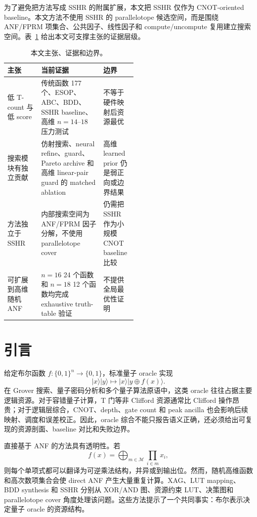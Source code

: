 \documentclass[UTF8,fontset=macnew,11pt]{ctexart}
\begin{document}
为了避免把方法写成 SSHR 的附属扩展，本文把 SSHR 仅作为 CNOT-oriented baseline。本文方法不使用 SSHR 的 parallelotope 候选空间，而是围绕 ANF/FPRM 项集合、公共因子、线性因子和 compute/uncompute 复用建立搜索空间。表~\ref{tab:claim_evidence} 给出本文可支撑主张的证据层级。

\begin{table}[t]
\centering
\small
\caption{本文主张、证据和边界。}
\label{tab:claim_evidence}
\begin{tabularx}{\linewidth}{>{\raggedright\arraybackslash}p{0.26\linewidth}
  >{\raggedright\arraybackslash}X
  >{\raggedright\arraybackslash}p{0.26\linewidth}}
\toprule
主张 & 当前证据 & 边界 \\
\midrule
低 T-count 与低 score & 传统函数 177 个、ESOP、ABC、BDD、SSHR baseline、高维 $n=14$--$18$ 压力测试 & 不等于硬件映射后资源最优 \\
搜索模块有独立贡献 & 仿射搜索、neural refine、guard、Pareto archive 和高维 linear-pair guard 的 matched ablation & 高维 learned prior 仍是弱正向或边界结果 \\
方法独立于 SSHR & 内部搜索空间为 ANF/FPRM 因子分解，不使用 parallelotope cover & 仍需把 SSHR 作为小规模 CNOT baseline 比较 \\
可扩展到高维随机 ANF & $n=16$ 24 个函数和 $n=18$ 12 个函数均完成 exhaustive truth-table 验证 & 不提供全局最优性证明 \\
\bottomrule
\end{tabularx}
\end{table}

\section{引言}

给定布尔函数 $f:\{0,1\}^{n}\rightarrow\{0,1\}$，标准量子 oracle 实现
\begin{equation}
  |x\rangle|y\rangle \mapsto |x\rangle|y\oplus f(x)\rangle .
\end{equation}
在 Grover 搜索、量子密码分析和多个量子算法原语中，这类 oracle 往往占据主要逻辑资源。对于容错量子计算，T 门等非 Clifford 资源通常比 Clifford 操作昂贵；对于逻辑层综合，CNOT、depth、gate count 和 peak ancilla 也会影响后续映射、调度和误差校正。因此，oracle 综合不能只报告语义正确，还必须给出可复现的资源剖面、baseline 对比和失败边界。

直接基于 ANF 的方法具有透明性。若
\begin{equation}
  f(x)=\bigoplus_{m\in\mathcal{M}}\prod_{i\in m}x_i ,
\end{equation}
则每个单项式都可以翻译为可逆乘法结构，并异或到输出位。然而，随机高维函数和高次数项集合会使 direct ANF 产生大量重复计算。XAG、LUT mapping、BDD synthesis 和 SSHR 分别从 XOR/AND 图、资源约束 LUT、决策图和 parallelotope cover 角度处理该问题\cite{meuli2022xag,meuli2020ros,wille2009bdd,zheng2025sshr}。这些方法提示了一个共同事实：布尔表示决定量子 oracle 的资源结构。
\end{document}
